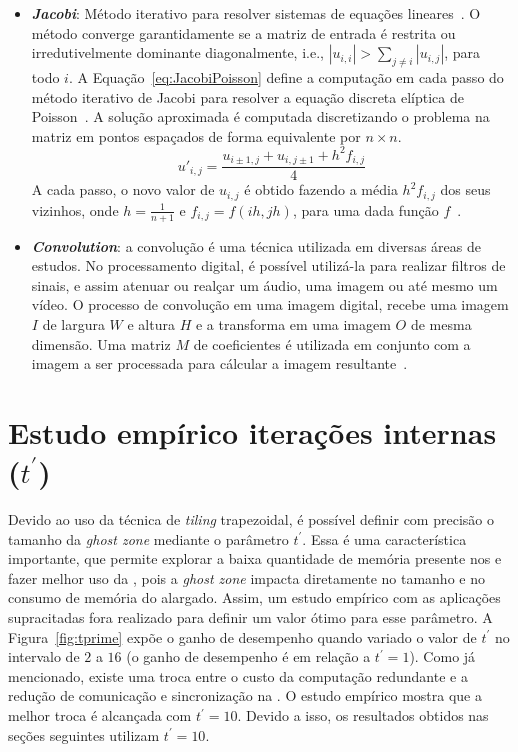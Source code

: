 \begin{itemize}
  \item \textbf{\textit{Jacobi}}: Método iterativo para resolver sistemas de equações lineares~\cite{demmel97}.
  O método converge garantidamente se a matriz de entrada é restrita ou irredutivelmente dominante diagonalmente, i.e., $|u_{i,i}| > \sum_{j\neq i}{|u_{i,j}|}$, para todo $i$.
  A Equação~\ref{eq:JacobiPoisson} define a computação em cada passo do método iterativo de Jacobi para resolver a equação discreta elíptica de Poisson~\cite{demmel97}. A solução aproximada é computada discretizando o problema na matriz em pontos espaçados de forma equivalente por $n\times n$.\\
   \begin{equation}
   u'_{i,j} = \frac{u_{i\pm1,j} + u_{i,j\pm1} + h^2f_{i,j}}{4}
   \label{eq:JacobiPoisson}
   \end{equation}
   A cada passo, o novo valor de $u_{i,j}$ é obtido fazendo a média $h^2f_{i,j}$ dos seus vizinhos, onde $h = \frac{1}{n+1}$ e $f_{i,j} = f(ih,jh)$,
   para uma dada função $f$~\cite{Podesta:TCC}.

  \item \textbf{\textit{Convolution}}: a convolução é uma técnica utilizada em diversas áreas de estudos. No processamento digital, é possível utilizá-la para realizar filtros de sinais, e assim atenuar ou realçar um áudio, uma imagem ou até mesmo um vídeo. O processo de convolução em uma imagem digital, recebe uma imagem $\mathit{I}$ de largura $\mathit{W}$ e altura $\mathit{H}$ e a transforma em uma imagem $\mathit{O}$ de mesma dimensão. Uma matriz $\mathit{M}$ de coeficientes é utilizada em conjunto com a imagem a ser processada para cálcular a imagem resultante~\cite{CPE:CPE3479}.
\end{itemize}

\section{Estudo empírico iterações internas ($t^\prime$)}
\label{sec:tam_tile_alargado}

Devido ao uso da técnica de \textit{tiling} trapezoidal, é possível definir com precisão o tamanho da \textit{ghost zone} mediante o parâmetro $t^\prime$. Essa é uma característica importante, que permite explorar a baixa quantidade de memória presente nos \clusters e fazer melhor uso da \noc, pois a \textit{ghost zone} impacta diretamente no tamanho e no consumo de memória do \tile alargado. Assim, um estudo empírico com as aplicações supracitadas fora realizado para definir um valor ótimo para esse parâmetro. A Figura~\ref{fig:tprime} expõe o ganho de desempenho quando variado o valor de $t^\prime$ no intervalo de $2$ a $16$ (o ganho de desempenho é em relação a $t^\prime=1$). Como já mencionado, existe uma troca entre o custo da computação redundante e a redução de comunicação e sincronização na \noc. O estudo empírico mostra que a melhor troca é alcançada com $t^\prime=10$. Devido a isso, os resultados obtidos nas seções seguintes utilizam $t^\prime=10$.

